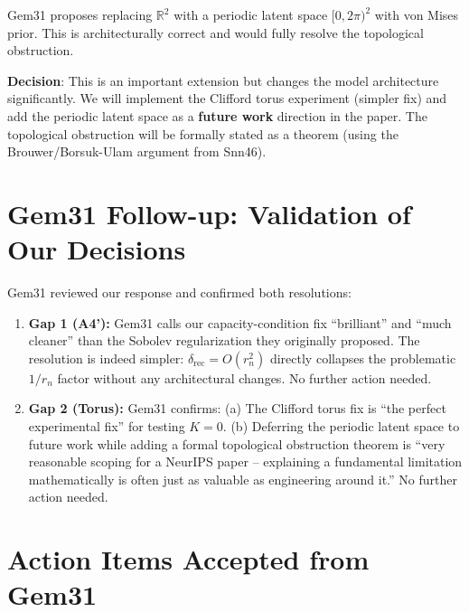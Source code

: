 \documentclass{article}
\begin{document}
\begin{partial}
Gem31 proposes replacing $\mathbb{R}^2$ with a periodic latent space
$[0, 2\pi)^2$ with von Mises prior. This is architecturally correct and would
fully resolve the topological obstruction.

\textbf{Decision}: This is an important extension but changes the model
architecture significantly. We will implement the Clifford torus experiment
(simpler fix) and add the periodic latent space as a \textbf{future work}
direction in the paper. The topological obstruction will be formally stated
as a theorem (using the Brouwer/Borsuk-Ulam argument from Snn46).
\end{partial}

\section{Gem31 Follow-up: Validation of Our Decisions}

Gem31 reviewed our response and confirmed both resolutions:

\begin{enumerate}
  \item \textbf{Gap 1 (A4'):} Gem31 calls our capacity-condition fix ``brilliant''
    and ``much cleaner'' than the Sobolev regularization they originally proposed.
    The resolution is indeed simpler: $\delta_{\mathrm{rec}} = O(r_n^2)$ directly
    collapses the problematic $1/r_n$ factor without any architectural changes.
    No further action needed.

  \item \textbf{Gap 2 (Torus):} Gem31 confirms:
    (a) The Clifford torus fix is ``the perfect experimental fix'' for testing $K=0$.
    (b) Deferring the periodic latent space to future work while adding a formal
    topological obstruction theorem is ``very reasonable scoping for a NeurIPS
    paper -- explaining a fundamental limitation mathematically is often just as
    valuable as engineering around it.''
    No further action needed.
\end{enumerate}

\section{Action Items Accepted from Gem31}
\end{document}
